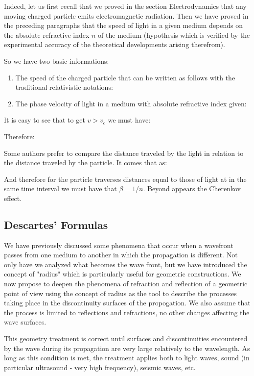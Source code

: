 	Indeed, let us first recall that we proved in the section Electrodynamics that any moving charged particle emits electromagnetic radiation. Then we have proved in the preceding paragraphs that the speed of light in a given medium depends on the absolute refractive index $n$ of the medium (hypothesis which is verified by the experimental accuracy of the theoretical developments arising therefrom).
	
	So we have two basic informations:
	\begin{enumerate}
		\item The speed of the charged particle that can be written as follows with the traditional relativistic notations:
		

		\item The phase velocity of light in a medium with absolute refractive index given:
		
	\end{enumerate}
	It is easy to see that to get $v>v_c$ we must have:
	
	Therefore:
	
	Some authors prefer to compare the distance traveled by the light in relation to the distance traveled by the particle. It comes that as:
	
	And therefore for the particle traverses distances equal to those of light at in the same time interval we must have that $\beta=1/n$. Beyond appears the Cherenkov effect.
	
	\pagebreak
	\subsection{Descartes' Formulas}
	We have previously discussed some phenomena that occur when a wavefront passes from one medium to another in which the propagation is different. Not only have we analyzed what becomes the wave front, but we have introduced the concept of "radius" which is particularly useful for geometric constructions. We now propose to deepen the phenomena of refraction and reflection of a geometric point of view using the concept of radius as the tool to describe the processes taking place in the discontinuity surfaces of the propogation. We also assume that the process is limited to reflections and refractions, no other changes affecting the wave surfaces.

	This geometry treatment is correct until surfaces and discontinuities encountered by the wave during its propagation are very large relatively to the wavelength. As long as this condition is met, the treatment applies both to light waves, sound (in particular ultrasound - very high frequency), seismic waves, etc.

